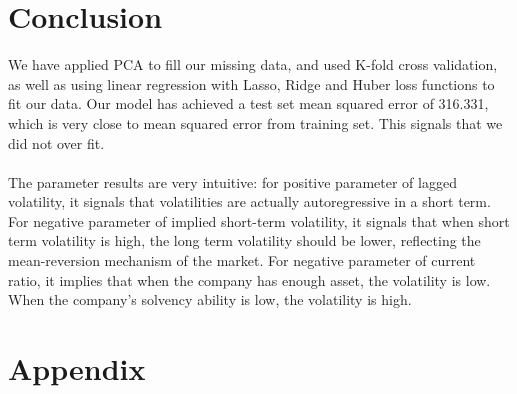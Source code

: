 \documentclass[a4paper]{article}
\begin{document}
\section{Conclusion}
We have applied PCA to fill our missing data, and used K-fold cross validation, as well as using linear regression with Lasso, Ridge and Huber loss functions to fit our data. Our model has achieved a test set mean squared error of 316.331, which is very close to mean squared error from training set. This signals that we did not over fit.
\\\\The parameter results are very intuitive: for positive parameter of lagged volatility, it signals that volatilities are actually autoregressive in a short term. For negative parameter of implied short-term volatility, it signals that when short term volatility is high, the long term volatility should be lower, reflecting the mean-reversion mechanism of the market. For negative parameter of current ratio, it implies that when the company has enough asset, the volatility is low. When the company's solvency ability is low, the volatility is high.


\section{Appendix}
\end{document}
